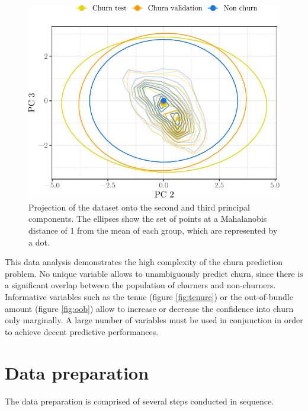 \begin{figure}
    \centering
    \includegraphics[width=0.8\linewidth]{figures/pca_2_3.pdf}
    \caption{Projection of the dataset onto the second and third principal
    components. The ellipses show the set of points at a Mahalanobis distance of
    1 from the mean of each group, which are represented by a dot.}
    \label{fig:pca_2_3}
\end{figure}

This data analysis demonstrates the high complexity of the churn prediction
problem. No unique variable allows to unambiguously predict churn, since there
is a significant overlap between the population of churners and non-churners.
Informative variables such as the tenue (figure \ref{fig:tenure}) or the
out-of-bundle amount (figure \ref{fig:oob}) allow to increase or decrease the
confidence into churn only marginally. A large number of variables must be used
in conjunction in order to achieve decent predictive performances.

\section{Data preparation}
\label{sec:data_pre}

The data preparation is comprised of several steps conducted in sequence.

